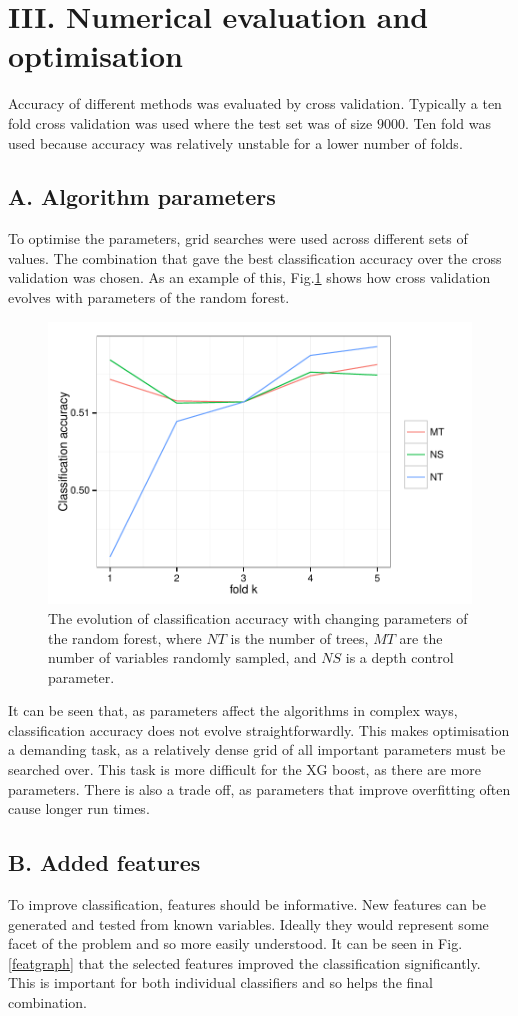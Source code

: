 \documentclass[onecolumn,prl,aps,10pt]{revtex4}
\begin{document}
\section{III. Numerical evaluation and optimisation} 
Accuracy of different methods was evaluated by cross validation. Typically a ten fold cross validation was used where the test set was of size $9000$. Ten fold was used because accuracy was relatively unstable for a lower number of folds. 

\subsection{A. Algorithm parameters}
To optimise the parameters, grid searches were used across different sets of values. The combination that gave the best classification accuracy over the cross validation was chosen. As an example of this, Fig.\ref{vargraph} shows how cross validation evolves with parameters of the random forest.

\begin{figure}
\includegraphics*[height=0.4\linewidth , width=0.8\linewidth,clip]{ClassAccRFvariables.pdf}
\caption{The evolution of classification accuracy with changing parameters of the random forest, where $NT$ is the number of trees, $MT$ are the number of variables randomly sampled, and $NS$ is a depth control parameter.} \label{vargraph}
\end{figure}

It can be seen that, as parameters affect the algorithms in complex ways, classification accuracy does not evolve straightforwardly. This makes optimisation a demanding task, as  a relatively dense grid of all important parameters must be searched over. This task is more difficult for the XG boost, as there are more parameters. There is also a trade off, as parameters that improve overfitting often cause longer run times. 

\subsection{B. Added features}
To improve classification, features should be informative. New features can be generated and tested from known variables. Ideally they would represent some facet of the problem and so more easily understood. It can be seen in Fig.\ref{featgraph} that the selected features improved the classification significantly. This is important for both individual classifiers and so helps the final combination. 
\end{document}
